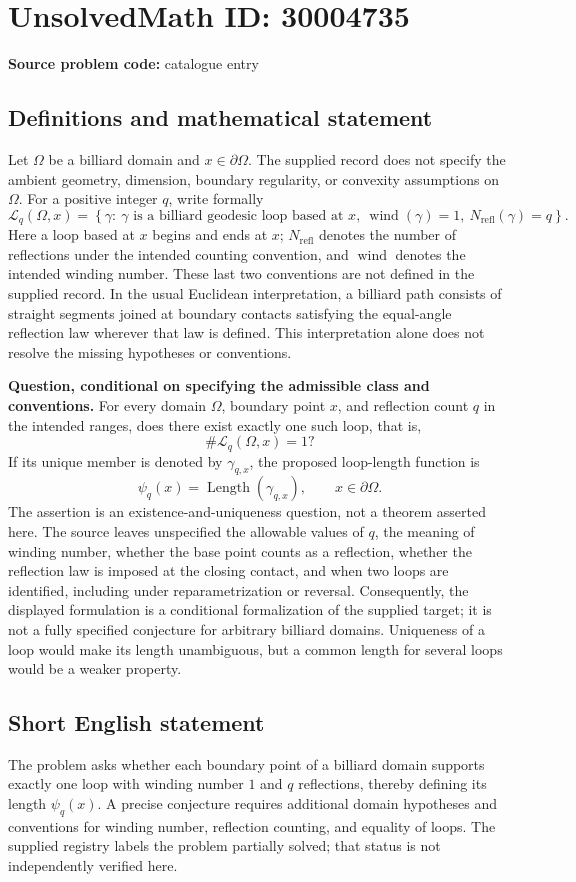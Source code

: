 \documentclass[11pt]{article}
\begin{document}
\section*{UnsolvedMath ID: 30004735}
\textbf{Source problem code:} catalogue entry
\subsection{Definitions and mathematical statement}
Let \(\Omega\) be a billiard domain and \(x\in\partial\Omega\). The supplied record does not specify the ambient geometry, dimension, boundary regularity, or convexity assumptions on \(\Omega\). For a positive integer \(q\), write formally
\[
\mathcal L_q(\Omega,x)=\left\{\gamma:\ \gamma\text{ is a billiard geodesic loop based at }x,\ \operatorname{wind}(\gamma)=1,\ N_{\mathrm{refl}}(\gamma)=q\right\}.
\]
Here a loop based at \(x\) begins and ends at \(x\); \(N_{\mathrm{refl}}\) denotes the number of reflections under the intended counting convention, and \(\operatorname{wind}\) denotes the intended winding number. These last two conventions are not defined in the supplied record. In the usual Euclidean interpretation, a billiard path consists of straight segments joined at boundary contacts satisfying the equal-angle reflection law wherever that law is defined. This interpretation alone does not resolve the missing hypotheses or conventions.

\textbf{Question, conditional on specifying the admissible class and conventions.} For every domain \(\Omega\), boundary point \(x\), and reflection count \(q\) in the intended ranges, does there exist exactly one such loop, that is,
\[
\#\mathcal L_q(\Omega,x)=1?
\]
If its unique member is denoted by \(\gamma_{q,x}\), the proposed loop-length function is
\[
\psi_q(x)=\operatorname{Length}(\gamma_{q,x}),\qquad x\in\partial\Omega.
\]
The assertion is an existence-and-uniqueness question, not a theorem asserted here. The source leaves unspecified the allowable values of \(q\), the meaning of winding number, whether the base point counts as a reflection, whether the reflection law is imposed at the closing contact, and when two loops are identified, including under reparametrization or reversal. Consequently, the displayed formulation is a conditional formalization of the supplied target; it is not a fully specified conjecture for arbitrary billiard domains. Uniqueness of a loop would make its length unambiguous, but a common length for several loops would be a weaker property.
\subsection{Short English statement}
The problem asks whether each boundary point of a billiard domain supports exactly one loop with winding number \(1\) and \(q\) reflections, thereby defining its length \(\psi_q(x)\). A precise conjecture requires additional domain hypotheses and conventions for winding number, reflection counting, and equality of loops. The supplied registry labels the problem partially solved; that status is not independently verified here.
\end{document}
